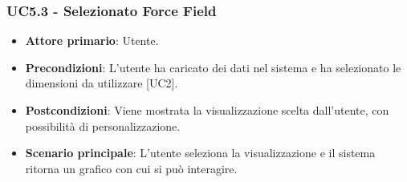 \subsubsection{UC5.3 - Selezionato Force Field}
\begin{itemize}
	\item \textbf{Attore primario}: Utente.
	\item \textbf{Precondizioni}: L'utente ha caricato dei dati nel sistema e ha selezionato le dimensioni da utilizzare [UC2].
	\item \textbf{Postcondizioni}: Viene mostrata la visualizzazione  scelta dall'utente, con possibilità di personalizzazione.
	\item \textbf{Scenario principale}: L'utente seleziona la visualizzazione  e il sistema ritorna un grafico con cui si può interagire.
\end{itemize}